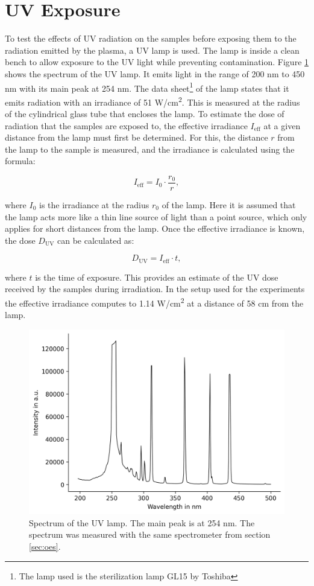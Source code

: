 \section{UV Exposure}
To test the effects of UV radiation on the samples before exposing them to the radiation emitted by the plasma, a UV lamp is used. The lamp is inside a clean bench to allow exposure to the UV light while preventing contamination. Figure \ref{fig:uv} shows the spectrum of the UV lamp. It emits light in the range of 200 nm to 450 nm with its main peak at 254 nm. The data sheet\footnote{The lamp used is the sterilization lamp \textsc{GL15} by Toshiba} of the lamp states that it emits radiation with an irradiance of 51 \textmu W/cm\textsuperscript{2}. This is measured at the radius of the cylindrical glass tube that encloses the lamp. To estimate the dose of radiation that the samples are exposed to, the effective irradiance $I_\text{eff}$ at a given distance from the lamp must first be determined. For this, the distance $r$ from the lamp to the sample is measured, and the irradiance is calculated using the formula:

\begin{equation}
I_\text{eff} = I_0 \cdot \frac{r_0}{r},
\end{equation}

where $I_0$ is the irradiance at the radius $r_0$ of the lamp. Here it is assumed that the lamp acts more like a thin line source of light than a point source, which only applies for short distances from the lamp. Once the effective irradiance is known, the dose $D_\text{UV}$ can be calculated as:

\begin{equation}
D_\text{UV} = I_\text{eff} \cdot t,
\end{equation}

where $t$ is the time of exposure. This provides an estimate of the UV dose received by the samples during irradiation. In the setup used for the experiments the effective irradiance computes to 1.14 \textmu W/cm\textsuperscript{2} at a distance of 58 cm from the lamp.


\begin{figure}
    \centering
    \includegraphics[width=.8\textwidth]{images/UV_lamp_no_glass.png}
    \caption[Spectrum of UV lamp]{Spectrum of the UV lamp. The main peak is at 254 nm. The spectrum was measured with the same spectrometer from section \ref{sec:oes}.}
    \label{fig:uv}
\end{figure}

